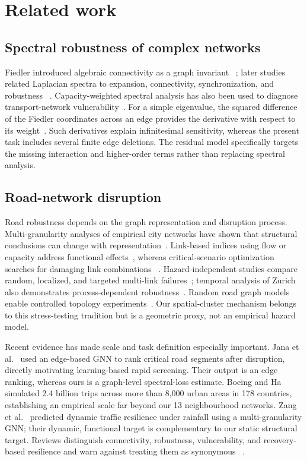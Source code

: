 \documentclass[11pt]{article}
\begin{document}
\section{Related work}
\subsection{Spectral robustness of complex networks}
Fiedler introduced algebraic connectivity as a graph invariant
~\cite{fiedler1973}; later studies related Laplacian spectra to expansion,
connectivity, synchronization, and robustness
~\cite{mohar1991,chung1997,jamakovic2008}. Capacity-weighted spectral analysis
has also been used to diagnose transport-network vulnerability~\cite{bell2017}.
For a simple eigenvalue, the squared difference of the Fiedler coordinates across an
edge provides the derivative with respect to its weight~\cite{kato1995}. Such derivatives explain
infinitesimal sensitivity, whereas the present task includes several finite edge
deletions. The residual model specifically targets the missing interaction and
higher-order terms rather than replacing spectral analysis.

\subsection{Road-network disruption}
Road robustness depends on the graph representation and disruption process.
Multi-granularity analyses of empirical city networks have shown that structural
conclusions can change with representation~\cite{duan2014}. Link-based indices
using flow or capacity address functional effects~\cite{scott2006,sullivan2010},
whereas critical-scenario optimization searches for damaging link combinations
~\cite{bagloee2017}. Hazard-independent studies compare random, localized, and
targeted multi-link failures~\cite{sohouenou2021}; temporal analysis of Zurich
also demonstrates process-dependent robustness~\cite{casali2020}. Random road
graph models enable controlled topology experiments~\cite{sohouenou2020}.
Our spatial-cluster mechanism belongs to this stress-testing tradition but is a
geometric proxy, not an empirical hazard model.

Recent evidence has made scale and task definition especially important. Jana et
al.~\cite{jana2023} used an edge-based GNN to rank critical road segments after
disruption, directly motivating learning-based rapid screening. Their output is
an edge ranking, whereas ours is a graph-level spectral-loss estimate. Boeing
and Ha~\cite{boeingha2024} simulated 2.4 billion trips across more than 8,000
urban areas in 178 countries, establishing an empirical scale far beyond our
13 neighbourhood networks. Zang et al.~\cite{zang2024} predicted dynamic traffic
resilience under rainfall using a multi-granularity GNN; their dynamic, functional target is complementary to our static structural target. Reviews
distinguish connectivity, robustness, vulnerability, and recovery-based
resilience and warn against treating them as synonymous
~\cite{rivera2022,mattsson2015,zeleke2026}.
\end{document}
